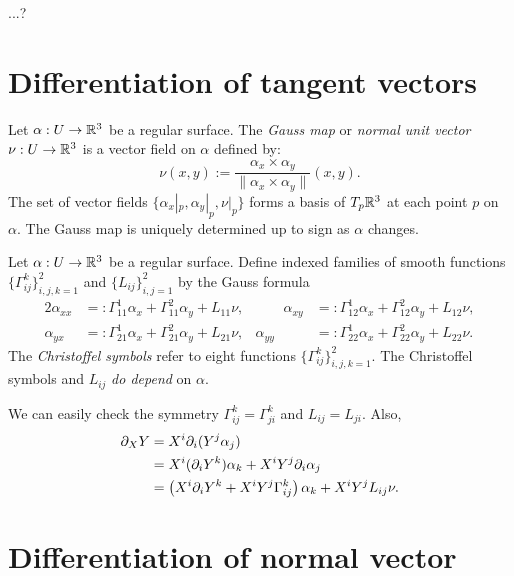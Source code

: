 \documentclass{../../large}
\renewcommand{\a}{\alpha}
\begin{document}
\begin{thm}
...?
\end{thm}




\section{Differentiation of tangent vectors}

\begin{defn}
Let $\a:U\to\R^3$ be a regular surface.
The \emph{Gauss map} or \emph{normal unit vector} $\nu:U\to\mathbb{R}^3$ is a vector field on $\a$ defined by:
\[\nu(x,y):=\frac{\a_x\times \a_y}{\|\a_x\times \a_y\|}(x,y).\]
The set of vector fields $\{\a_x|_p,\a_y|_p,\nu|_p\}$ forms a basis of $T_p\mathbb{R}^3$ at each point $p$ on $\a$.
The Gauss map is uniquely determined up to sign as $\a$ changes.
\end{defn}

\begin{defn}
Let $\a:U\to\R^3$ be a regular surface.
Define indexed families of smooth functions $\{\Gamma_{ij}^k\}_{i,j,k=1}^2$ and $\{L_{ij}\}_{i,j=1}^2$ by the Gauss formula
\begin{alignat*}{2}
\a_{xx}&=:\Gamma_{11}^1\a_x+\Gamma_{11}^2\a_y+L_{11}\nu,&\qquad
\a_{xy}&=:\Gamma_{12}^1\a_x+\Gamma_{12}^2\a_y+L_{12}\nu,\\
\a_{yx}&=:\Gamma_{21}^1\a_x+\Gamma_{21}^2\a_y+L_{21}\nu,&
\a_{yy}&=:\Gamma_{22}^1\a_x+\Gamma_{22}^2\a_y+L_{22}\nu.
\end{alignat*}
The \emph{Christoffel symbols} refer to eight functions $\{\Gamma_{ij}^k\}_{i,j,k=1}^2$.
The Christoffel symbols and $L_{ij}$ \emph{do depend} on $\a$.
\end{defn}
We can easily check the symmetry $\Gamma_{ij}^k=\Gamma_{ji}^k$ and $L_{ij}=L_{ji}$.
Also,
\begin{align*}
\pd_XY
&=X^i\pd_i(Y^j\a_j)\\
&=X^i(\pd_iY^k)\a_k+X^iY^j\pd_i\a_j\\
&=\left(X^i\pd_iY^k+X^iY^j\Gamma_{ij}^k\right)\a_k+X^iY^jL_{ij}\nu.
\end{align*}



\section{Differentiation of normal vector}
\end{document}
